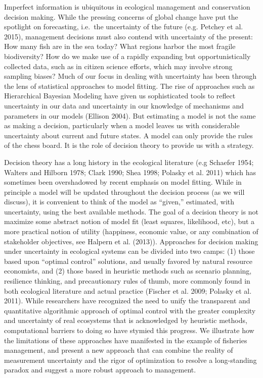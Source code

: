 \documentclass[3p]{elsarticle} %
\begin{document}
Imperfect information is ubiquitous in ecological management and
conservation decision making. While the pressing concerns of global
change have put the spotlight on forecasting, i.e.~the uncertainty of
the future (e.g. Petchey et al. 2015), management decisions must also
contend with uncertainty of the present: How many fish are in the sea
today? What regions harbor the most fragile biodiversity? How do we make
use of a rapidly expanding but opportunistically collected data, such as
in citizen science efforts, which may involve strong sampling biases?
Much of our focus in dealing with uncertainty has been through the lens
of statistical approaches to model fitting. The rise of approaches such
as Hierarchical Bayesian Modeling have given us sophisticated tools to
reflect uncertainty in our data and uncertainty in our knowledge of
mechanisms and parameters in our models (Ellison 2004). But estimating a
model is not the same as making a decision, particularly when a model
leaves us with considerable uncertainty about current and future states.
A model can only provide the rules of the chess board. It is the role of
decision theory to provide us with a strategy.

Decision theory has a long history in the ecological literature (e.g
Schaefer 1954; Walters and Hilborn 1978; Clark 1990; Shea 1998; Polasky
et al. 2011) which has sometimes been overshadowed by recent emphasis on
model fitting. While in principle a model will be updated throughout the
decision process (as we will discuss), it is convenient to think of the
model as ``given,'' estimated, with uncertainty, using the best
available methods. The goal of a decision theory is not maximize some
abstract notion of model fit (least squares, likelihood, etc), but a
more practical notion of utility (happiness, economic value, or any
combination of stakeholder objectives, see Halpern et al. (2013)).
Approaches for decision making under uncertainty in ecological systems
can be divided into two camps: (1) those based upon ``optimal control''
solutions, and usually favored by natural resource economists, and (2)
those based in heuristic methods such as scenario planning, resilience
thinking, and precautionary rules of thumb, more commonly found in both
ecological literature and actual practice (Fischer et al. 2009; Polasky
et al. 2011). While researchers have recognized the need to unify the
transparent and quantitative algorithmic approach of optimal control
with the greater complexity and uncertainty of real ecosystems that is
acknowledged by heuristic methods, computational barriers to doing so
have stymied this progress. We illustrate how the limitations of these
approaches have manifested in the example of fisheries management, and
present a new approach that can combine the reality of measurement
uncertainty and the rigor of optimization to resolve a long-standing
paradox and suggest a more robust approach to management.
\end{document}
